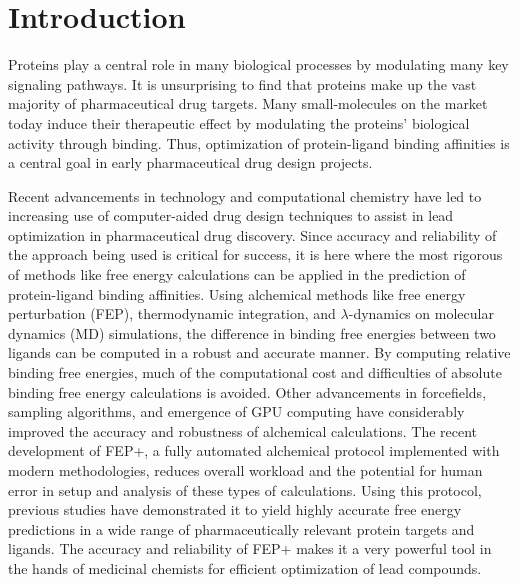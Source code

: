 \section{Introduction}
Proteins play a central role in many biological processes by modulating many key signaling pathways.
It is unsurprising to find that proteins make up the vast majority of pharmaceutical drug targets.
Many small-molecules on the market today induce their therapeutic effect by modulating the proteins' biological activity through binding\cite{overington2006many,FCP:FCP548,Lundstrom2009}.
Thus, optimization of protein-ligand binding affinities is a central goal in early pharmaceutical drug design projects.

Recent advancements in technology and computational chemistry have led to increasing use of computer-aided drug design techniques to assist in lead optimization in pharmaceutical drug discovery.
Since accuracy and reliability of the approach being used is critical for success, it is here where the most rigorous of methods like free energy calculations can be applied in the prediction of protein-ligand binding affinities.
Using alchemical methods like free energy perturbation (FEP), thermodynamic integration, and $\lambda$-dynamics on molecular dynamics (MD) simulations, the difference in binding free energies between two ligands can be computed in a robust and accurate manner.
By computing relative binding free energies, much of the computational cost and difficulties of absolute binding free energy calculations is avoided\cite{doi:10.1021/ct5000296,chipot2007free,chodera2011alchemical,knight2009lambda,zheng2008random,gallicchio2011advances,doi:10.1021/ct500161f}.
Other advancements in forcefields, sampling algorithms, and emergence of GPU computing have considerably improved the accuracy and robustness of alchemical calculations.
The recent development of FEP+, a fully automated alchemical protocol implemented with modern methodologies, reduces overall workload and the potential for human error in setup and analysis of these types of calculations.
Using this protocol, previous studies\cite{FEPplus} have demonstrated it to yield highly accurate free energy predictions in a wide range of pharmaceutically relevant protein targets and ligands.
The accuracy and reliability of FEP+ makes it a very powerful tool in the hands of medicinal chemists for efficient optimization of lead compounds.

